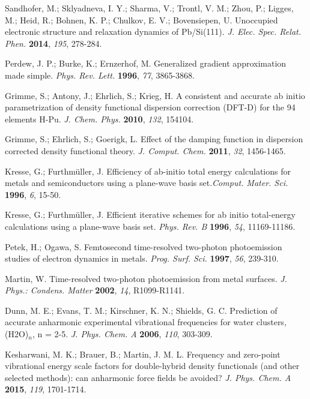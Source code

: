 \documentclass[aps,twocolumn,amssymb,amsfonts,amsmath,showpacs,final,a4paper,superscriptaddress]{revtex4-2}
\begin{document}
\begin{thebibliography}{99}
 Sandhofer, M.; Sklyadneva, I. Y.; Sharma, V.; Trontl, V. M.; Zhou, P.; Ligges, M.; Heid, R.; Bohnen, K. P.; Chulkov, E. V.; Bovensiepen, U. Unoccupied electronic structure and relaxation dynamics of Pb/Si(111). \textit{J. Elec. Spec. Relat. Phen.} \textbf{2014}, \textit{195}, 278-284.

 Perdew, J. P.; Burke, K.; Ernzerhof, M. Generalized gradient approximation made simple. \textit{Phys. Rev. Lett.} \textbf{1996}, \textit{77}, 3865-3868.


 Grimme, S.; Antony, J.; Ehrlich, S.; Krieg, H. A consistent and accurate ab initio parametrization of density functional dispersion correction (DFT-D) for the 94 elements H-Pu. \textit{J. Chem. Phys.} \textbf{2010}, \textit{132}, 154104.

 Grimme, S.; Ehrlich, S.; Goerigk, L. Effect of the damping function in dispersion corrected density functional theory. \textit{J. Comput. Chem.} \textbf{2011}, \textit{32}, 1456-1465.

 Kresse, G.; Furthm\"{u}ller, J. Efficiency of ab-initio total energy calculations for metals and semiconductors using a plane-wave basis set.\textit{Comput. Mater. Sci.} \textbf{1996}, \textit{6}, 15-50.

 Kresse, G.; Furthm\"{u}ller, J. Efficient iterative schemes for ab initio total-energy calculations using a plane-wave basis set. \textit{Phys. Rev. B} \textbf{1996}, \textit{54}, 11169-11186.

 Petek, H.; Ogawa, S. Femtosecond time-resolved two-photon photoemission studies of electron dynamics in metals. \textit{Prog. Surf. Sci.} \textbf{1997}, \textit{56}, 239-310.

 Martin, W. Time-resolved two-photon photoemission from metal surfaces. \textit{J. Phys.: Condens. Matter} \textbf{2002}, \textit{14}, R1099-R1141.

 Dunn, M. E.; Evans, T. M.; Kirschner, K. N.; Shields, G. C. Prediction of accurate anharmonic experimental vibrational frequencies for water clusters, (H2O)$_n$, n = 2-5. \textit{J. Phys. Chem. A} \textbf{2006}, \textit{110}, 303-309.

 Kesharwani, M. K.; Brauer, B.; Martin, J. M. L. Frequency and zero-point vibrational energy scale factors for double-hybrid density functionals (and other selected methods): can anharmonic force fields be avoided? \textit{J. Phys. Chem. A} \textbf{2015}, \textit{119}, 1701-1714.


\end{thebibliography}
\end{document}
